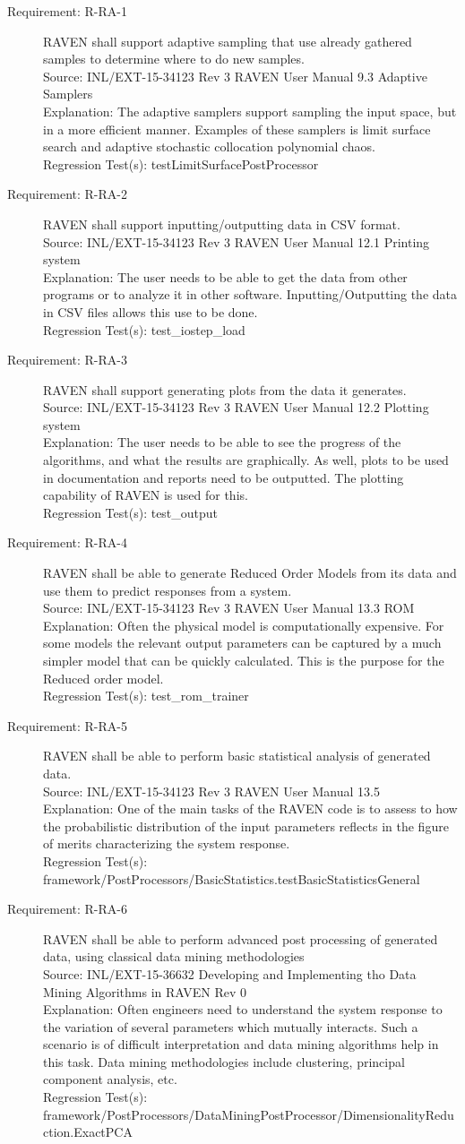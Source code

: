 \documentclass{article}
\newcommand{\requirement}[5]{\item[Requirement: #1] #2 \\Source: #3\\Explanation: #4\\Regression Test(s): #5}
\begin{document}
\begin{description}

\requirement{R-RA-1}{RAVEN shall support adaptive sampling that use already gathered samples to determine where to do new samples.}
{INL/EXT-15-34123 Rev 3 RAVEN User Manual 9.3 Adaptive Samplers}
{The adaptive samplers support sampling the input space, but in a more efficient manner.  Examples of these samplers is limit surface search and adaptive stochastic collocation polynomial chaos.}
{testLimitSurfacePostProcessor}

\requirement{R-RA-2}{RAVEN shall support inputting/outputting data in CSV format.}
{INL/EXT-15-34123 Rev 3 RAVEN User Manual 12.1 Printing system}
{The user needs to be able to get the data from other programs or to analyze it in other software.  Inputting/Outputting the data in CSV files allows this use to be done.}
{test\_iostep\_load}

\requirement{R-RA-3}{RAVEN shall support generating plots from the data it generates.}
{INL/EXT-15-34123 Rev 3 RAVEN User Manual 12.2 Plotting system}
{The user needs to be able to see the progress of the algorithms, and what the results are graphically.  As well, plots to be used in documentation and reports need to be outputted.  The plotting capability of RAVEN is used for this.}
{test\_output}

\requirement{R-RA-4}{RAVEN shall be able to generate Reduced Order Models from its data and use them to predict responses from a system.}
{INL/EXT-15-34123 Rev 3 RAVEN User Manual 13.3 ROM}
{Often the physical model is computationally expensive.  For some models the relevant output parameters can be captured by a much simpler model that can be quickly calculated.  This is the purpose for the Reduced order model.}
{test\_rom\_trainer}

\requirement{R-RA-5}{RAVEN shall be able to perform basic statistical analysis of generated data.}
{INL/EXT-15-34123 Rev 3 RAVEN User Manual 13.5}
{One of the main tasks of the RAVEN code is to assess to how the probabilistic distribution of the input parameters reflects in the figure of merits characterizing the system response.}
{framework/PostProcessors/BasicStatistics.testBasicStatisticsGeneral}

\requirement{R-RA-6}{RAVEN shall be able to perform advanced post processing of generated data, using classical data mining methodologies}
{INL/EXT-15-36632 Developing and Implementing tho Data Mining Algorithms in RAVEN Rev 0}
{Often engineers need to understand the system response to the variation of several parameters which mutually interacts. Such a scenario is of difficult interpretation and data mining algorithms help in this task.  Data mining methodologies include clustering, principal component analysis, etc.}
{framework/PostProcessors/DataMiningPostProcessor/DimensionalityReduction.ExactPCA}


\end{description}
\end{document}
